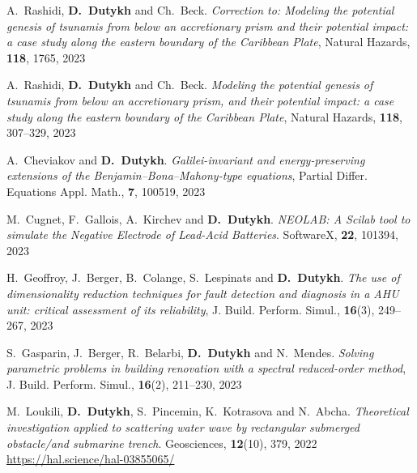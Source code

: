 \documentclass[final, a4paper, oneside, 12pt]{article}
\numberwithin{equation}{section}
\begin{document}
\begin{etaremune}
  \item A.~Rashidi, \textbf{D.~Dutykh} and Ch.~Beck. \textit{Correction to: Modeling the potential genesis of tsunamis from below an accretionary prism and their potential impact: a case study along the eastern boundary of the Caribbean Plate}, Natural Hazards, \textbf{118}, 1765, 2023 %
  
  \item A.~Rashidi, \textbf{D.~Dutykh} and Ch.~Beck. \textit{Modeling the potential genesis of tsunamis from below an accretionary prism, and their potential impact: a case study along the eastern boundary of the Caribbean Plate}, Natural Hazards, \textbf{118}, 307--329, 2023 %

  \item A.~Cheviakov and \textbf{D.~Dutykh}. \textit{Galilei-invariant and energy-preserving extensions of the Benjamin--Bona--Mahony-type equations}, Partial Differ. Equations Appl. Math., \textbf{7}, 100519, 2023 %

  \item M.~Cugnet, F.~Gallois, A.~Kirchev and \textbf{D.~Dutykh}. \textit{NEOLAB: A Scilab tool to simulate the Negative Electrode of Lead-Acid Batteries}. SoftwareX, \textbf{22}, 101394, 2023 %
  
  \item H.~Geoffroy, J.~Berger, B.~Colange, S.~Lespinats and \textbf{D.~Dutykh}. \textit{The use of dimensionality reduction techniques for fault detection and diagnosis in a AHU unit: critical assessment of its reliability}, J. Build. Perform. Simul., \textbf{16}(3), 249--267, 2023 %

  \item S.~Gasparin, J.~Berger, R.~Belarbi, \textbf{D.~Dutykh} and N.~Mendes. \textit{Solving parametric problems in building renovation with a spectral reduced-order method}, J. Build. Perform. Simul., \textbf{16}(2), 211--230, 2023 %


  
  \item M.~Loukili, \textbf{D.~Dutykh}, S.~Pincemin, K.~Kotrasova and N.~Abcha. \textit{Theoretical investigation applied to scattering water wave by rectangular submerged obstacle/and submarine trench}. Geosciences, \textbf{12}(10), 379, 2022 \\ %
  \url{https://hal.science/hal-03855065/}
  

\end{etaremune}
\end{document}
